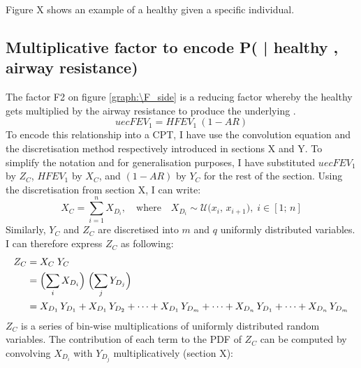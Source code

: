 Figure X shows an example of a healthy \F given a specific individual. 


\subsection{Multiplicative factor to encode P( \F | healthy \F, airway resistance)}
The factor F2 on figure \ref{graph:\F_side} is a reducing factor whereby the healthy \F gets multiplied by the airway resistance to produce the underlying \F.
\begin{equation}
uecF\!EV_1 = H\!F\!EV_1\ (1-A\!R)
\end{equation}
To encode this relationship into a CPT, I have use the convolution equation and the discretisation method respectively introduced in sections X and Y. To simplify the notation and for generalisation purposes, I have substituted $uecF\!EV_1$ by $Z_C$, $H\!F\!EV_1$ by $X_C$, and $(1-A\!R)$ by $Y_C$ for the rest of the section. Using the discretisation from section X, I can write:
\begin{equation}
X_C = \sum_{i = 1}^n X_{D_i},
\quad\text{where}\quad
X_{D_i} \sim \mathcal{U}\bigl(x_i,\,x_{i+1}\bigr),\; i\!\in\![1;\,n]
\end{equation}
Similarly, $Y_{C}$ and $Z_C$ are discretised into $m$ and $q$ uniformly distributed variables. I can therefore express $Z_C$ as following:
\begin{equation}
\begin{aligned}
Z_C &= X_C \; Y_C 
\\
&= \Bigl(\sum_{i} X_{D_i}\Bigr)
   \;
   \Bigl(\sum_{j} Y_{D_j}\Bigr)
\\
&= X_{D_1}\,Y_{D_1}
   + X_{D_1}\,Y_{D_2}
   +\dots+X_{D_1}\,Y_{D_m}
   +\dots+X_{D_n}\,Y_{D_1}+\dots+X_{D_n}\,Y_{D_m}
\end{aligned}
\end{equation}
$Z_C$ is a series of bin-wise multiplications of uniformly distributed random variables. The contribution of each term to the PDF of  $Z_C$ can be computed by convolving $X_{D_i}$ with $Y_{D_j}$ multiplicatively (section X):
